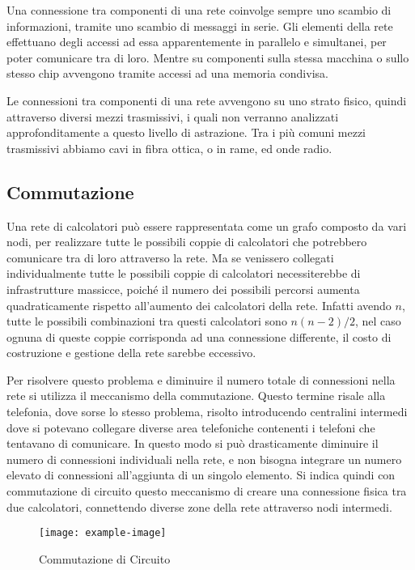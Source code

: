 \documentclass{article}
\numberwithin{equation}{subsection}
\begin{document}
Una connessione tra componenti di una rete coinvolge sempre uno scambio di informazioni, tramite uno scambio di messaggi in serie. Gli elementi della 
rete effettuano degli accessi ad essa apparentemente in parallelo e simultanei, per poter comunicare tra di loro. Mentre su componenti sulla stessa macchina o sullo 
stesso chip avvengono tramite accessi ad una memoria condivisa. 

Le connessioni tra componenti di una rete avvengono su uno strato fisico, quindi attraverso diversi mezzi trasmissivi, i quali non verranno analizzati approfonditamente a 
questo livello di astrazione. Tra i più comuni mezzi trasmissivi abbiamo cavi in fibra ottica, o in rame, ed onde radio. 

\subsection{Commutazione}

Una rete di calcolatori può essere rappresentata come un grafo composto da vari nodi, per realizzare tutte le possibili coppie di calcolatori che potrebbero comunicare 
tra di loro attraverso la rete. Ma se venissero collegati individualmente tutte le possibili coppie di calcolatori necessiterebbe di infrastrutture massicce, poiché 
il numero dei possibili percorsi aumenta quadraticamente rispetto all'aumento dei calcolatori della rete. Infatti avendo $n$, tutte le possibili combinazioni tra 
questi calcolatori sono $n(n-2)/2$, nel caso ognuna di queste coppie corrisponda ad una connessione differente, il costo di costruzione e gestione della rete 
sarebbe eccessivo. 

Per risolvere questo problema e diminuire il numero totale di connessioni nella rete si utilizza il meccanismo della commutazione. Questo termine risale alla telefonia, 
dove sorse lo stesso problema, risolto introducendo centralini intermedi dove si potevano collegare diverse area telefoniche contenenti i telefoni che tentavano 
di comunicare. In questo modo si può drasticamente diminuire il numero di connessioni individuali nella rete, e non bisogna integrare un numero elevato di connessioni 
all'aggiunta di un singolo elemento. 
Si indica quindi con commutazione di circuito questo meccanismo di creare una connessione fisica tra due calcolatori, connettendo diverse zone 
della rete attraverso nodi intermedi. 
\begin{figure}[H]%
    \centering%
    \texttt{[image: example-image]}%
    \caption{Commutazione di Circuito}%
\end{figure}
\end{document}
